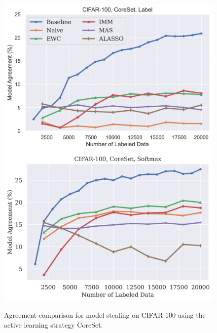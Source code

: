 \begin{figure}[!htb]
    \centering
    \includegraphics[width=0.48\linewidth]{images/results_CALMS/cifar100_label_coreset.png} \hfill
    \includegraphics[width=0.48\linewidth]{images/results_CALMS/cifar100_softmax_coreset.png}
    \caption{Agreement comparison for model stealing on CIFAR-100 using the active learning strategy CoreSet.}
    \label{fig:CALMSCIFAR100CoreSet}
\end{figure}

\clearpage

